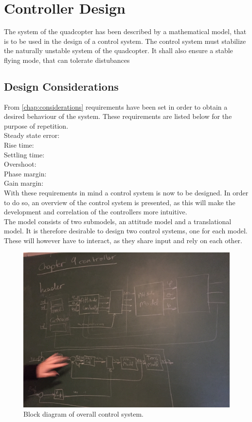 \chapter{Controller Design}\label{chap:Control}
The system of the quadcopter has been described by a mathematical model, that is to be used in the design of a control system. The control system must stabilize the naturally unstable system of the quadcopter. It shall also ensure a stable flying mode, that can tolerate distubances 
\section{Design Considerations}
From \ref{chap:considerations} requirements have been set in order to obtain a desired behaviour of the system. These requirements are listed below for the purpose of repetition.\\
Steady state error: \\
Rise time: \\
Settling time:\\
Overshoot:\\
Phase margin: \\
Gain margin: \\

With these requirements in mind a control system is now to be designed. In order to do so, an overview of the control system is presented, as this will make the development and correlation of the controllers more intuitive. \\

The model consists of two submodels, an attitude model and a translational model. It is therefore desirable to design two control systems, one for each model. These will however have to interact, as they share input and rely on each other. 

\begin{figure}[H]
	\centering
	\includegraphics[width=0.7 \textwidth]{figures/ControlHeadDiagram.JPG}
	\caption{Block diagram of overall control system.}
	\label{fig:ControlHeadDiagram}
\end{figure}


